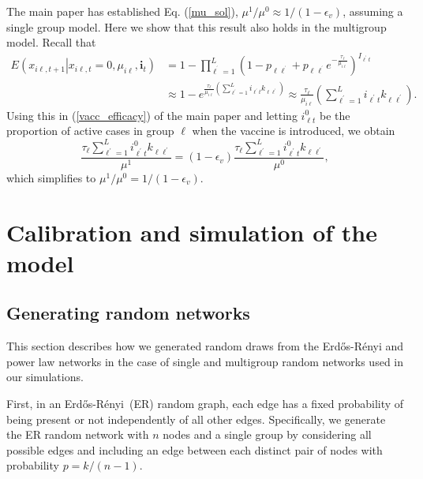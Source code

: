 \documentclass[12pt]{article}
\begin{document}
The main paper has established Eq. (\ref{mu_sol}), $\mu^{1}/\mu^{0}%
\approx1/\left(  1-\epsilon_{v}\right)  $, assuming a single group model. Here
we show that this result also holds in the multigroup model. Recall that
\begin{align*}
E\left(  x_{i\ell,t+1}\left\vert x_{i\ell,t}=0,\mu_{i\ell},\mathbf{i}%
_{t}\right.  \right)   &  =1-\prod_{\ell^{^{\prime}}=1}^{L}\left(
1-p_{\ell\ell^{^{\prime}}}+p_{\ell\ell^{^{\prime}}}e^{-\frac{\tau_{\ell}}%
{\mu_{i\ell}}}\right)  ^{I_{\ell^{\prime}t}}\\
&  \approx1-e^{\frac{\tau_{\ell}}{\mu_{i\ell}}\left(  \sum_{\ell^{\prime}%
=1}^{L}i_{\ell^{\prime}t}k_{\ell\ell^{\prime}}\right)  }\approx\frac
{\tau_{\ell}}{\mu_{i\ell}}\left(  \sum_{\ell^{\prime}=1}^{L}i_{\ell^{\prime}%
t}k_{\ell\ell^{\prime}}\right)  .
\end{align*}
Using this in (\ref{vacc_efficacy}) of the main paper and letting $i_{\ell
t}^{0}$ be the proportion of active cases in group $\ell$ when the vaccine is
introduced, we obtain%
\[
\frac{\tau_{\ell}\sum_{\ell^{\prime}=1}^{L}i_{\ell^{\prime}t}^{0}k_{\ell
\ell^{\prime}}}{\mu^{1}}=\left(  1-\epsilon_{v}\right)  \frac{\tau_{\ell}%
\sum_{\ell^{\prime}=1}^{L}i_{\ell^{\prime}t}^{0}k_{\ell\ell^{\prime}}}{\mu
^{0}},
\]
which simplifies to $\mu^{1}/\mu^{0}=1/\left(  1-\epsilon_{v}\right)  $.

\section{Calibration and simulation of the model\label{Sup: calibration}}

\subsection{Generating random networks\label{Sup: Power Law}}

This section describes how we generated random draws from the
Erd\H{o}s-R\'{e}nyi and power law networks in the case of single and
multigroup random networks used in our simulations.

First, in an Erd\H{o}s-R\'{e}nyi\ (ER) random graph, each edge has a fixed
probability of being present or not independently of all other edges.
Specifically, we generate the ER random network with $n$ nodes and a single
group by considering all possible edges and including an edge between each
distinct pair of nodes with probability $p=k/\left(  n-1\right)  $.
\end{document}
